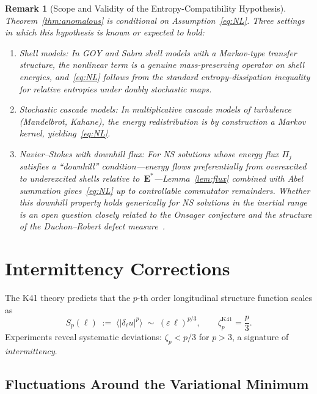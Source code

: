 \documentclass[12pt,a4paper]{article}
\theoremstyle{breakdef}
\theoremstyle{breakplain}
\theoremstyle{breakdef}
\newtheorem{remark}[definition]{Remark}
\begin{document}
\begin{remark}[Scope and Validity of the Entropy-Compatibility Hypothesis]
Theorem~\ref{thm:anomalous} is conditional on
Assumption~\eqref{eq:NL}.  Three settings in which this hypothesis
is known or expected to hold:
\begin{enumerate}
\item \emph{Shell models:} In GOY and Sabra shell models with a
  Markov-type transfer structure, the nonlinear term is a genuine
  mass-preserving operator on shell energies, and~\eqref{eq:NL}
  follows from the standard entropy-dissipation inequality for
  relative entropies under doubly stochastic maps.
\item \emph{Stochastic cascade models:} In multiplicative cascade models
  of turbulence (Mandelbrot, Kahane), the energy redistribution is
  by construction a Markov kernel, yielding~\eqref{eq:NL}.
\item \emph{Navier--Stokes with downhill flux:} For NS solutions whose
  energy flux $\Pi_j$ satisfies a ``downhill'' condition---energy flows
  preferentially from overexcited to underexcited shells relative
  to~$\mathbf{E}^*$---Lemma~\ref{lem:flux} combined with Abel
  summation gives~\eqref{eq:NL} up to controllable commutator
  remainders.  Whether this downhill property holds generically for
  NS solutions in the inertial range is an open question closely
  related to the Onsager conjecture and the structure of the
  Duchon--Robert defect measure~\cite{DR00}.
\end{enumerate}
\end{remark}

\section{Intermittency Corrections}\label{sec:intermittency}

The K41 theory predicts that the $p$-th order longitudinal structure
function scales as
\begin{equation}\label{eq:Sp_K41}
  S_p(\ell) \;:=\;
  \bigl\langle |\delta_\ell u|^p \bigr\rangle
  \;\sim\; (\varepsilon\,\ell)^{p/3},
  \qquad
  \zeta_p^{\mathrm{K41}} = \frac{p}{3}.
\end{equation}
Experiments reveal systematic deviations: $\zeta_p < p/3$ for $p > 3$,
a signature of \emph{intermittency}.

\subsection{Fluctuations Around the Variational Minimum}
\end{document}

